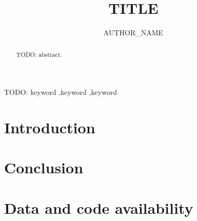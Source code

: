 \documentclass[authoryear,preprint,review,12pt]{elsarticle}
\newcommand{\pending}[1]{\textcolor{orange!80!black}{#1}}
\newcommand{\panel}[1]{\textbf{(#1)}~}
\begin{document}
\begin{frontmatter}

\title{{{TITLE}}}

\author[a]{{{AUTHOR_NAME}}}
\address[a]{{{AFFILIATION}}}

\begin{abstract}
\pending{TODO: abstract.}
\end{abstract}

\begin{keyword}
TODO: keyword \sep keyword \sep keyword
\end{keyword}

\end{frontmatter}

\linenumbers

\section{Introduction}\label{sec:intro}


\section{Conclusion}\label{sec:conclusion}

\section*{Data and code availability}



\end{document}
